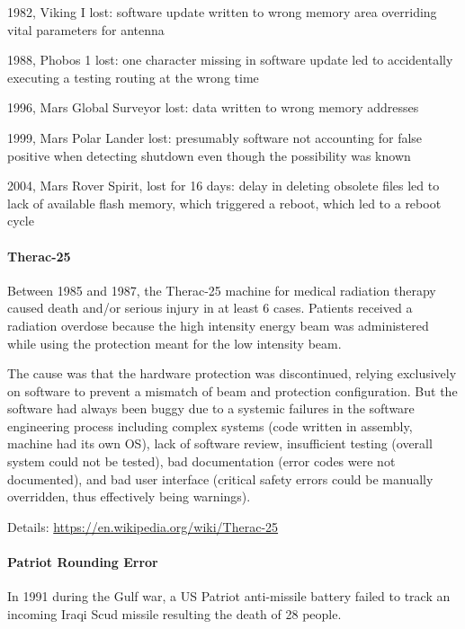 \begin{compactitem}
 \item 1982, Viking I lost: software update written to wrong memory area overriding vital parameters for antenna
 \item 1988, Phobos 1 lost: one character missing in software update led to accidentally executing a testing routing at the wrong time
 \item 1996, Mars Global Surveyor lost: data written to wrong memory addresses
 \item 1999, Mars Polar Lander lost: presumably software not accounting for false positive when detecting shutdown even though the possibility was known
 \item 2004, Mars Rover Spirit, lost for 16 days: delay in deleting obsolete files led to lack of available flash memory, which triggered a reboot, which led to a reboot cycle
\end{compactitem}

\paragraph{Therac-25}
Between 1985 and 1987, the Therac-25 machine for medical radiation therapy caused death and/or serious injury in at least $6$ cases.
Patients received a radiation overdose because the high intensity energy beam was administered while using the protection meant for the low intensity beam.

The cause was that the hardware protection was discontinued, relying exclusively on software to prevent a mismatch of beam and protection configuration.
But the software had always been buggy due to a systemic failures in the software engineering process including complex systems (code written in assembly, machine had its own OS), lack of software review, insufficient testing (overall system could not be tested), bad documentation (error codes were not documented), and bad user interface (critical safety errors could be manually overridden, thus effectively being warnings).

Details: \url{https://en.wikipedia.org/wiki/Therac-25}

\paragraph{Patriot Rounding Error}
In 1991 during the Gulf war, a US Patriot anti-missile battery failed to track an incoming Iraqi Scud missile resulting the death of 28 people.

